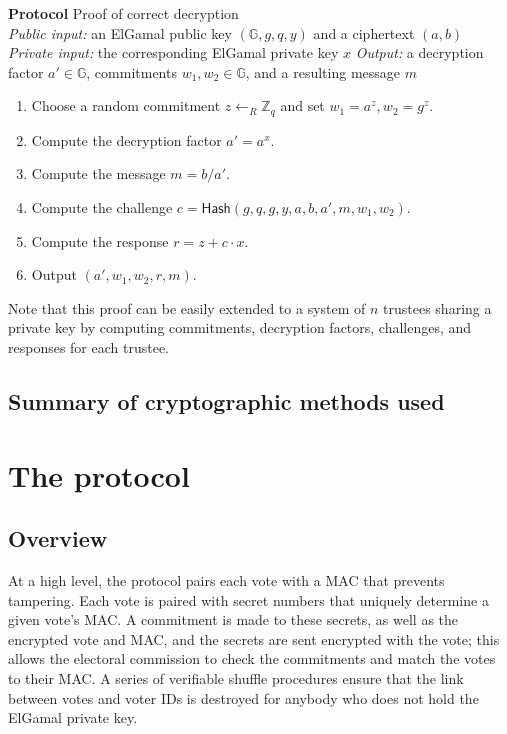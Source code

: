\documentclass[12pt,a4paper]{article}
\makeatletter
\theoremstyle{definition}
\newcounter{protocol}
\newenvironment{protocol}[1]
  {\par\addvspace{\topsep}
   \noindent
   \tabularx{\linewidth}{@{} X @{}}
    \refstepcounter{protocol}\textbf{Protocol \theprotocol} #1 \\
    \hline}
  {
    \endtabularx
   }
\makeatother
\begin{document}
\begin{protocol}{Proof of correct decryption}\label{prot:ProofDecrypt}
    \textit{Public input:} an ElGamal public key $(\mathbb{G}, g, q, y)$ and a ciphertext $(a, b)$\\
    \textit{Private input:} the corresponding ElGamal private key $x$
    \textit{Output:} a decryption factor $a'\in\mathbb{G}$, commitments $w_1, w_2\in\mathbb{G}$, and a resulting message $m$
    \begin{enumerate}
        \item Choose a random commitment $z\leftarrow_R\mathbb{Z}_q$ and set $w_1 = a^z, w_2 = g^z$.
        \item Compute the decryption factor $a'=a^x$.
        \item Compute the message $m=b/a'$.
        \item Compute the challenge $c=\mathsf{Hash}(g, q, g, y, a, b, a', m, w_1, w_2)$.
        \item Compute the response $r=z+c\cdot x$.
        \item Output $(a', w_1, w_2, r, m)$.
    \end{enumerate}
\end{protocol}
Note that this proof can be easily extended to a system of $n$ trustees sharing a private key by computing commitments, decryption factors, challenges, and responses for each trustee.

\subsection{Summary of cryptographic methods used}
\section{The protocol}\label{sec-protocol}
\subsection{Overview}
At a high level, the protocol pairs each vote with a MAC that prevents tampering. Each vote is paired with secret numbers that uniquely determine a given vote's MAC. A commitment is made to these secrets, as well as the encrypted vote and MAC, and the secrets are sent encrypted with the vote; this allows the electoral commission to check the commitments and match the votes to their MAC. A series of verifiable shuffle procedures ensure that the link between votes and voter IDs is destroyed for anybody who does not hold the ElGamal private key.
\end{document}
